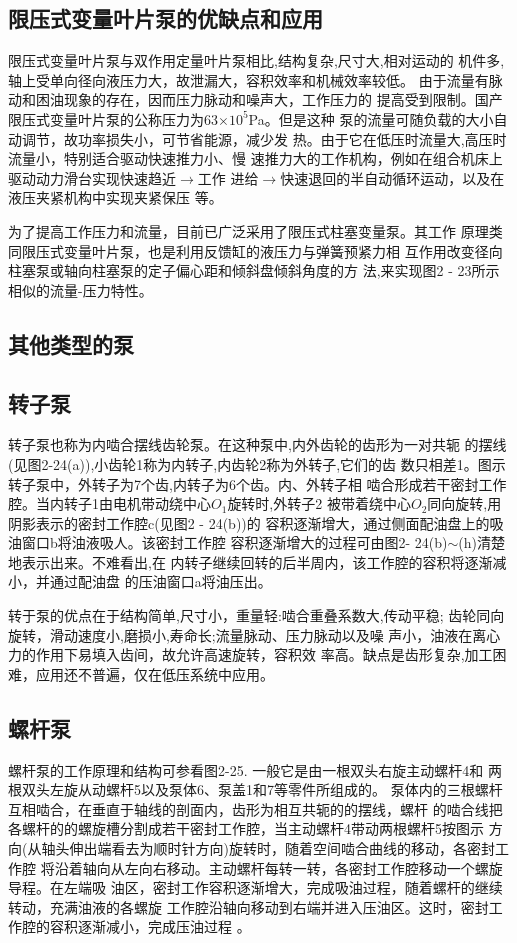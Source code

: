 \subsection*{限压式变量叶片泵的优缺点和应用}
限压式变量叶片泵与双作用定量叶片泵相比,结构复杂,尺寸大,相对运动的
机件多,轴上受单向径向液压力大，故泄漏大，容积效率和机械效率较低。
由于流量有脉动和困油现象的存在，因而压力脉动和噪声大，工作压力的
提高受到限制。国产限压式变量叶片泵的公称压力为63$\times $$10^5$Pa。但是这种
泵的流量可随负载的大小自动调节，故功率损失小，可节省能源，减少发
热。由于它在低压时流量大,高压时流量小，特别适合驱动快速推力小、慢
速推力大的工作机构，例如在组合机床上驱动动力滑台实现快速趋近$\rightarrow$工作
进给$\rightarrow$快速退回的半自动循环运动，以及在液压夹紧机构中实现夹紧保压
等。

为了提高工作压力和流量，目前已广泛采用了限压式柱塞变量泵。其工作
原理类同限压式变量叶片泵，也是利用反馈缸的液压力与弹簧预紧力相
互作用改变径向柱塞泵或轴向柱塞泵的定子偏心距和倾斜盘倾斜角度的方
法,来实现图2 - 23所示相似的流量-压力特性。
\begin{center}
    \section*{其他类型的泵}  
\end{center}
\subsection*{转子泵}
转子泵也称为内啮合摆线齿轮泵。在这种泵中,内外齿轮的齿形为一对共轭
的摆线(见图2-24(a)),小齿轮1称为内转子,内齿轮2称为外转子,它们的齿
数只相差1。图示转子泵中，外转子为7个齿,内转子为6个齿。内、外转子相
啮合形成若干密封工作腔。当内转子1由电机带动绕中心$O_1$旋转时,外转子2
被带着绕中心$O_2$同向旋转,用阴影表示的密封工作腔c(见图2 - 24(b))的
容积逐渐增大，通过侧面配油盘上的吸油窗口b将油液吸人。该密封工作腔
容积逐渐增大的过程可由图2- 24(b)$\sim $(h)清楚地表示出来。不难看出,在
内转子继续回转的后半周内，该工作腔的容积将逐渐减小，并通过配油盘
的压油窗口a将油压出。

转于泵的优点在于结构简单,尺寸小，重量轻:啮合重叠系数大,传动平稳;
齿轮同向旋转，滑动速度小,磨损小,寿命长;流量脉动、压力脉动以及噪
声小，油液在离心力的作用下易填入齿间，故允许高速旋转，容积效
率高。缺点是齿形复杂,加工困难，应用还不普遍，仅在低压系统中应用。
\subsection*{螺杆泵}
螺杆泵的工作原理和结构可参看图2-25. 一般它是由一根双头右旋主动螺杆4和
两根双头左旋从动螺杆5以及泵体6、泵盖1和7等零件所组成的。
泵体内的三根螺杆互相啮合，在垂直于轴线的剖面内，齿形为相互共轭的的摆线，螺杆
的啮合线把各螺杆的的螺旋槽分割成若干密封工作腔，当主动螺杆4带动两根螺杆5按图示
方向(从轴头伸出端看去为顺时针方向)旋转时，随着空间啮合曲线的移动，各密封工作腔
将沿着轴向从左向右移动。主动螺杆每转一转，各密封工作腔移动一个螺旋导程。在左端吸
油区，密封工作容积逐渐增大，完成吸油过程，随着螺杆的继续转动，充满油液的各螺旋
工作腔沿轴向移动到右端并进入压油区。这时，密封工作腔的容积逐渐减小，完成压油过程
。

